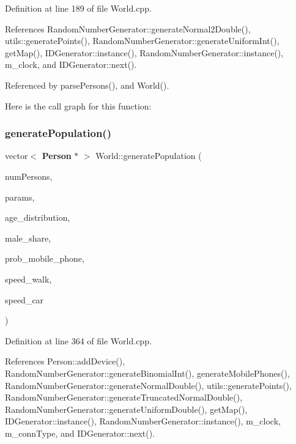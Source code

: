 Definition at line 189 of file World.\+cpp.



References Random\+Number\+Generator\+::generate\+Normal2\+Double(), utils\+::generate\+Points(), Random\+Number\+Generator\+::generate\+Uniform\+Int(), get\+Map(), I\+D\+Generator\+::instance(), Random\+Number\+Generator\+::instance(), m\+\_\+clock, and I\+D\+Generator\+::next().



Referenced by parse\+Persons(), and World().

Here is the call graph for this function\+:
\mbox{\label{class_world_ac6bb92d77d6be53323a24b0fd825f986}} 
\subsubsection{generate\+Population()\hspace{0.1cm}{\footnotesize\ttfamily [2/2]}}
{\footnotesize\ttfamily vector$<$ \textbf{ Person} $\ast$ $>$ World\+::generate\+Population (\begin{DoxyParamCaption}\item[{unsigned long}]{num\+Persons,  }\item[{vector$<$ double $>$}]{params,  }\item[{\textbf{ Person\+::\+Age\+Distributions}}]{age\+\_\+distribution,  }\item[{double}]{male\+\_\+share,  }\item[{double}]{prob\+\_\+mobile\+\_\+phone,  }\item[{double}]{speed\+\_\+walk,  }\item[{double}]{speed\+\_\+car }\end{DoxyParamCaption})\hspace{0.3cm}{\ttfamily [private]}}



Definition at line 364 of file World.\+cpp.



References Person\+::add\+Device(), Random\+Number\+Generator\+::generate\+Binomial\+Int(), generate\+Mobile\+Phones(), Random\+Number\+Generator\+::generate\+Normal\+Double(), utils\+::generate\+Points(), Random\+Number\+Generator\+::generate\+Truncated\+Normal\+Double(), Random\+Number\+Generator\+::generate\+Uniform\+Double(), get\+Map(), I\+D\+Generator\+::instance(), Random\+Number\+Generator\+::instance(), m\+\_\+clock, m\+\_\+conn\+Type, and I\+D\+Generator\+::next().

